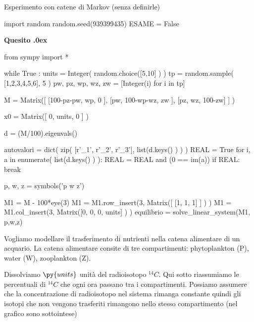 \documentclass[11pt,twoside,a4paper]{article}
\newcounter{quesito}
\newenvironment{question}{\bigskip\addtocounter{quesito}{1}\bigskip\bigskip\par\textbf{Quesito \thequesito.\kern0ex}}{\par\vspace{\parskip}}
\begin{document}
\colorbox{blue!10}{\begin{minipage}{\textwidth}
Esperimento con catene di Markov (senza definirle)

\end{minipage}}


\begin{pycode}
import random
random.seed(939399435)
ESAME = False
\end{pycode}


\begin{question}
\def\Pr{{\rm Pr\,}}
\def\pyl#1{\py{latex(#1)}}
\everymath{\displaystyle}
\def\nicefrac#1#2{#1/#2}
\renewcommand{\arraystretch}{1.3}
\begin{pycode}
from sympy import *

while True :
    units = Integer( random.choice([5,10] ) )
    tp  =  random.sample( [1,2,3,4,5,6], 5 ) 
    pw, pz, wp, wz, zw = [Integer(i) for i in tp] 

    M = Matrix([ [100-pz-pw, wp,        0     ],
                [pw,        100-wp-wz, zw    ],
                [pz,        wz,        100-zw] ] )

    x0 = Matrix([ 0, units, 0 ] )

    d = (M/100).eigenvals()

    autovalori = dict( zip( [r'\lambda_1', r'\lambda_2', r'\lambda_3'], 
                           list(d.keys() ) ) )
    REAL = True
    for i, a in enumerate( list(d.keys() ) ):
        REAL = REAL and (0 == im(a))
    if REAL: break

p, w, z = symbols('p w z')


M1 = M - 100*eye(3)
M1 = M1.row_insert(3, Matrix([ [1, 1, 1] ] ) )
M1 = M1.col_insert(3, Matrix([0, 0, 0, units] ) )
equilibrio = solve_linear_system(M1, p,w,z)

\end{pycode}
Vogliamo modellare il trasferimento di nutrienti nella catena alimentare di un acquario. La catena alimentare consite di tre compartimenti: phytoplankton ({\sf P}), water ({\sf W}), zooplankton ({\sf Z}).

Dissolviamo $\py{units}$ unità del radioisotopo $^{14}C$. Qui sotto riassumiamo le percentuali di $^{14}C$ che ogni ora passano tra i compartimenti. Possiamo assumere che la concentrazione di radioisotopo nel sistema rimanga constante quindi gli isotopi che non vengono trasferiti rimangono nello stesso compartimento (nel grafico sono sottointese)


\end{question}
\end{document}
